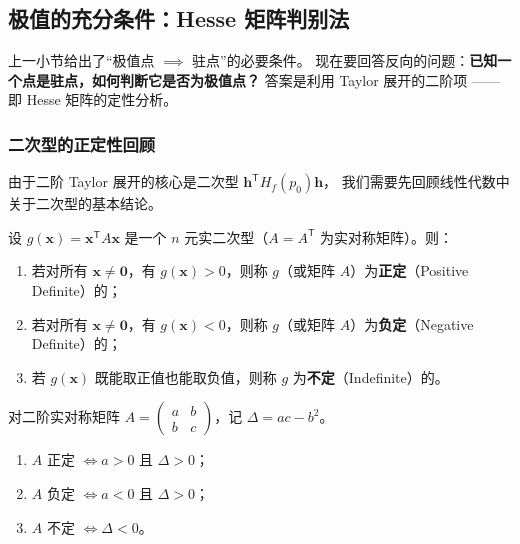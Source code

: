 \documentclass[lang=cn,11pt]{elegantbook}
\begin{document}
\subsection{极值的充分条件：Hesse 矩阵判别法}

上一小节给出了“极值点 $\implies$ 驻点”的必要条件。
现在要回答反向的问题：\textbf{已知一个点是驻点，如何判断它是否为极值点？}
答案是利用 Taylor 展开的二阶项 —— 即 Hesse 矩阵的定性分析。


\subsubsection*{二次型的正定性回顾}

由于二阶 Taylor 展开的核心是二次型 $\boldsymbol h^{\mathsf T}H_f(p_0)\boldsymbol h$，
我们需要先回顾线性代数中关于二次型的基本结论。

\begin{definition}[二次型的定性] \label{def:quadratic-form-definiteness}
设 $g(\boldsymbol x)=\boldsymbol x^{\mathsf T}A\boldsymbol x$ 是一个 $n$ 元实二次型（$A=A^{\mathsf T}$ 为实对称矩阵）。则：
\begin{enumerate}
  \item[(i)] 若对所有 $\boldsymbol x \neq \boldsymbol 0$，有 $g(\boldsymbol x) > 0$，则称 $g$（或矩阵 $A$）为\textbf{正定}（Positive Definite）的；
  \item[(ii)] 若对所有 $\boldsymbol x \neq \boldsymbol 0$，有 $g(\boldsymbol x) < 0$，则称 $g$（或矩阵 $A$）为\textbf{负定}（Negative Definite）的；
  \item[(iii)] 若 $g(\boldsymbol x)$ 既能取正值也能取负值，则称 $g$ 为\textbf{不定}（Indefinite）的。
\end{enumerate}
\end{definition}

\begin{theorem} \label{thm:sylvester-criterion}
对二阶实对称矩阵 $A = \begin{pmatrix} a & b \\ b & c \end{pmatrix}$，记 $\Delta = ac - b^2$。
\begin{enumerate}
  \item[(1)] $A$ 正定 $\Longleftrightarrow a > 0$ 且 $\Delta > 0$；
  \item[(2)] $A$ 负定 $\Longleftrightarrow a < 0$ 且 $\Delta > 0$；
  \item[(3)] $A$ 不定 $\Longleftrightarrow \Delta < 0$。
\end{enumerate}
\end{theorem}
\end{document}
